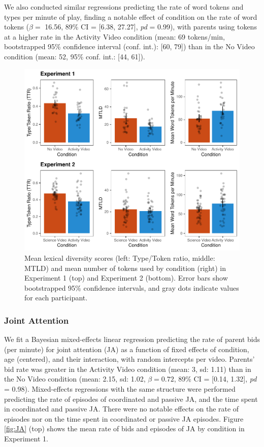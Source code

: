\documentclass[
  english,
  man]{apa6}
\begin{document}
We also conducted similar regressions predicting the rate of word tokens and types per minute of play, finding a notable effect of condition on the rate of word tokens (\(\beta=\) 16.56, 89\% CI = {[}6.38, 27.27{]}, \emph{pd} = 0.99), with parents using tokens at a higher rate in the Activity Video condition (mean: 69 tokens/min, bootstrapped 95\% confidence interval (conf. int.): {[}60, 79{]}) than in the No Video condition (mean: 52, 95\% conf. int.: {[}44, 61{]}).

\begin{figure}[H]

{\centering \includegraphics{figs/fig-lexdiv-1} 

}

\caption{\label{fig:lexdiv} Mean lexical diversity scores (left: Type/Token ratio, middle: MTLD) and mean number of tokens used by condition (right) in Experiment 1 (top) and Experiment 2 (bottom). Error bars show bootstrapped 95\% confidence intervals, and gray dots indicate values for each participant.}\label{fig:fig-lexdiv}
\end{figure}

\hypertarget{joint-attention}{%
\subsubsection{Joint Attention}\label{joint-attention}}

We fit a Bayesian mixed-effects linear regression predicting the rate of parent bids (per minute) for joint attention (JA) as a function of fixed effects of condition, age (centered), and their interaction, with random intercepts per video.
Parents' bid rate was greater in the Activity Video condition (mean: 3, sd: 1.11) than in the No Video condition (mean: 2.15, sd: 1.02, \(\beta=0.72\), 89\% CI = {[}0.14, 1.32{]}, \emph{pd} = 0.98).
Mixed-effects regressions with the same structure were performed predicting the rate of episodes of coordinated and passive JA, and the time spent in coordinated and passive JA.
There were no notable effects on the rate of episodes nor on the time spent in coordinated or passive JA episodes.
Figure \ref{fig:JA} (top) shows the mean rate of bids and episodes of JA by condition in Experiment 1.
\end{document}
